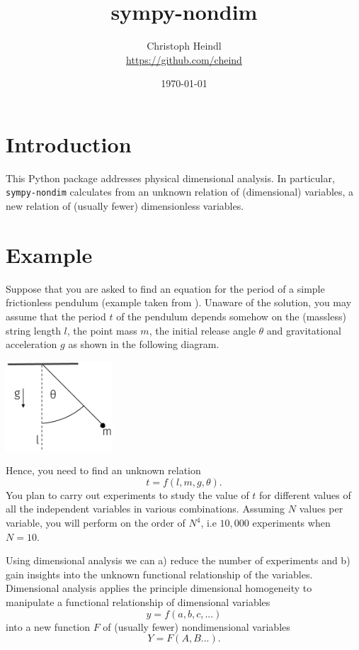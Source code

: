 \documentclass[11pt]{article}
\title{sympy-nondim}
\author{Christoph Heindl \\ \url{https://github.com/cheind} }
\date{\today}
\begin{document}
\maketitle

\section{Introduction}
This Python package addresses physical dimensional analysis. In particular, \texttt{sympy-nondim} calculates from an unknown relation of (dimensional) variables, a new relation of (usually fewer) dimensionless variables.

\section{Example}
Suppose that you are asked to find an equation for the period of a simple frictionless pendulum (example taken from \cite{lemons2017student}). Unaware of the solution, you may assume that the period $t$ of the pendulum depends somehow on the (massless) string length $l$, the point mass $m$, the initial release angle $\theta$ and gravitational acceleration $g$ as shown in the following diagram.
\begin{center}
\includegraphics[width=0.3\textwidth]{pendulum.png}
\end{center}
Hence, you need to find an unknown relation $$t = f(l,m,g,\theta).$$ You plan to carry out experiments to study the value of $t$ for different values of all the independent variables in various combinations. Assuming $N$ values per variable, you will perform on the order of $N^4$, i.e $10,000$ experiments when $N=10$. 

Using dimensional analysis we can a) reduce the number of experiments and b) gain insights into the unknown functional relationship of the variables. Dimensional analysis applies the principle dimensional homogeneity to manipulate a functional relationship of dimensional variables $$y = f(a,b,c,...)$$ into a new function $F$ of (usually fewer) nondimensional variables $$Y = F(A,B...).$$
\end{document}
